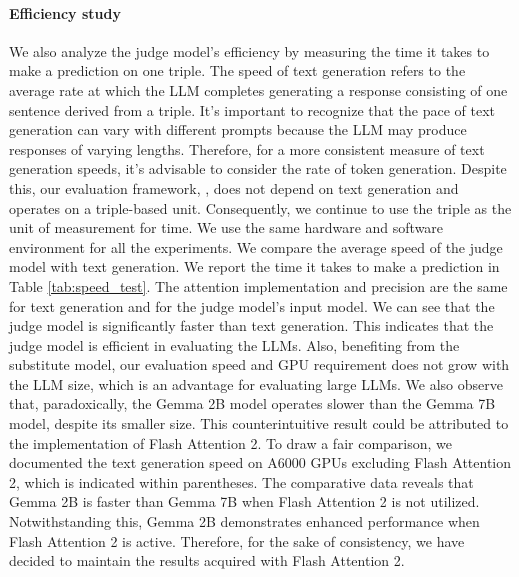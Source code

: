 \paragraph{Efficiency study}
We also analyze the judge model's efficiency by measuring the time it takes to make a prediction on one triple.
The speed of text generation refers to the average rate at which the LLM completes generating a response consisting of one sentence derived from a triple. It's important to recognize that the pace of text generation can vary with different prompts because the LLM may produce responses of varying lengths. Therefore, for a more consistent measure of text generation speeds, it's advisable to consider the rate of token generation. Despite this, our evaluation framework, \GraphEval{}, does not depend on text generation and operates on a triple-based unit. Consequently, we continue to use the triple as the unit of measurement for time.
We use the same hardware and software environment for all the experiments. We compare the average speed of the judge model with text generation. We report the time it takes to make a prediction in Table \ref{tab:speed_test}. 
 The attention implementation and precision are the same for text generation and for the judge model's input model. 
 We can see that the judge model is significantly faster than text generation. This indicates that the judge model is efficient in evaluating the LLMs. Also, benefiting from the substitute model, our evaluation speed and GPU requirement does not grow with the LLM size, which is an advantage for evaluating large LLMs.
 We also observe that, paradoxically, the Gemma 2B model operates slower than the Gemma 7B model, despite its smaller size. This counterintuitive result could be attributed to the implementation of Flash Attention 2. To draw a fair comparison, we documented the text generation speed on A6000 GPUs excluding Flash Attention 2, which is indicated within parentheses. The comparative data reveals that Gemma 2B is faster than Gemma 7B when Flash Attention 2 is not utilized. Notwithstanding this, Gemma 2B demonstrates enhanced performance when Flash Attention 2 is active. Therefore, for the sake of consistency, we have decided to maintain the results acquired with Flash Attention 2.

